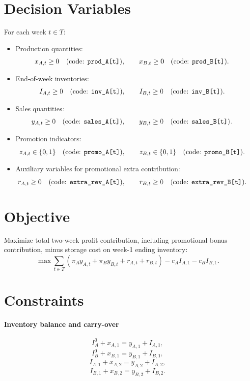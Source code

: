\section*{Decision Variables}

For each week $t \in T$:

\begin{itemize}
    \item Production quantities:
    \[
    x_{A,t} \ge 0 \quad \text{(code: \texttt{prod\_A[t]})}, \qquad
    x_{B,t} \ge 0 \quad \text{(code: \texttt{prod\_B[t]}).
    }
    \]

    \item End-of-week inventories:
    \[
    I_{A,t} \ge 0 \quad \text{(code: \texttt{inv\_A[t]})}, \qquad
    I_{B,t} \ge 0 \quad \text{(code: \texttt{inv\_B[t]}).
    }
    \]

    \item Sales quantities:
    \[
    y_{A,t} \ge 0 \quad \text{(code: \texttt{sales\_A[t]})}, \qquad
    y_{B,t} \ge 0 \quad \text{(code: \texttt{sales\_B[t]}).
    }
    \]

    \item Promotion indicators:
    \[
    z_{A,t} \in \{0,1\} \quad \text{(code: \texttt{promo\_A[t]})}, \qquad
    z_{B,t} \in \{0,1\} \quad \text{(code: \texttt{promo\_B[t]}).
    }
    \]

    \item Auxiliary variables for promotional extra contribution:
    \[
    r_{A,t} \ge 0 \quad \text{(code: \texttt{extra\_rev\_A[t]})}, \qquad
    r_{B,t} \ge 0 \quad \text{(code: \texttt{extra\_rev\_B[t]}).
    }
    \]
\end{itemize}

\section*{Objective}

Maximize total two-week profit contribution, including promotional bonus contribution, minus storage cost on week-1 ending inventory:
\[
\max \sum_{t \in T} \left(\pi_A y_{A,t} + \pi_B y_{B,t} + r_{A,t} + r_{B,t}\right)
 - c_A I_{A,1} - c_B I_{B,1}.
\]

\section*{Constraints}

\paragraph{Inventory balance and carry-over}
\[
I_A^0 + x_{A,1} = y_{A,1} + I_{A,1},
\]
\[
I_B^0 + x_{B,1} = y_{B,1} + I_{B,1},
\]
\[
I_{A,1} + x_{A,2} = y_{A,2} + I_{A,2},
\]
\[
I_{B,1} + x_{B,2} = y_{B,2} + I_{B,2}.
\]

